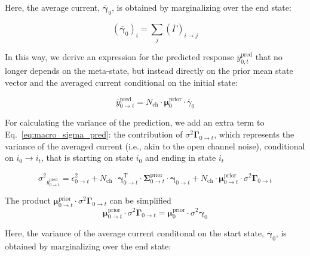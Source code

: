\documentclass[pdflatex,sn-mathphys-num]{sn-jnl}%
\theoremstyle{thmstyleone}%
\theoremstyle{thmstyletwo}%
\theoremstyle{thmstylethree}%
\begin{document}
Here, the average current, \( \overline{\mathbf{\gamma}}_{0} \), is obtained by marginalizing over the end state:

\begin{equation}
	(\overline{\mathbf{\gamma}}_{0})_i = \sum_j (\overline{\Gamma})_{i \rightarrow j}
\end{equation}

In this way, we derive an expression for the predicted response \( \overline{y}^{\text{pred}}_{0,t} \) that no longer depends on the meta-state, but instead directly on the prior mean state vector and the averaged current conditional on the initial state:

\begin{equation}
	\overline{y}^{\text{pred}}_{0 \rightarrow t} = N_{\text{ch}} \cdot \mathbf{\mu}^{\text{prior}}_{0} \cdot \overline{\gamma}_{0}
	\label{eq:macro_interval_predicted_y}
\end{equation}


For calculating the variance of the prediction, we add an extra term to Eq.~\ref{eq:macro_sigma_pred}: the contribution of ${\sigma^2 \mathbf{\Gamma}}_{0 \rightarrow t}$, which represents the variance of the averaged current (i.e., akin to the open channel noise), conditional on $i_0 \rightarrow i_t$, that is starting on state $i_0$ and ending in state $i_t$

\begin{equation}
	{\sigma^2}_{\overline{y}^{\mathrm{pred}}_{0 \rightarrow t}}
	= \epsilon^2_{0 \rightarrow t} + N_{\mathrm{ch}} \cdot \mathbf{\gamma}^{\mathrm{T}}_{0 \rightarrow t} \cdot \mathbf{\Sigma}^{\mathrm{prior}}_{0 \rightarrow t} \cdot \mathbf{\gamma}_{0 \rightarrow t}
	+ N_{\mathrm{ch}} \cdot \mathbf{\mu}^{\mathrm{prior}}_{0 \rightarrow t} \cdot {\sigma^2 \mathbf{\Gamma}}_{0 \rightarrow t}
	\label{eq:meta_macro_sigma_pred}
\end{equation}

The product $\mathbf{\mu}^{\mathrm{prior}}_{0 \rightarrow t} \cdot {\sigma^2 \mathbf{\Gamma}}_{0 \rightarrow t}$ can be simplified
\begin{equation}
	\mathbf{\mu}^{\mathrm{prior}}_{0 \rightarrow t} \cdot {\sigma^2 \mathbf{\Gamma}}_{0 \rightarrow t}= \mathbf{\mu}^{\mathrm{prior}}_{0} \cdot {\sigma^2 \mathbf{\gamma}}_{0}
	\label{eq:meta_channel_noise}
\end{equation}
 
Here, the variance of the average current conditonal on the start state, \( \overline{\mathbf{\gamma}}_{0} \), is obtained by marginalizing over the end state:
\end{document}
